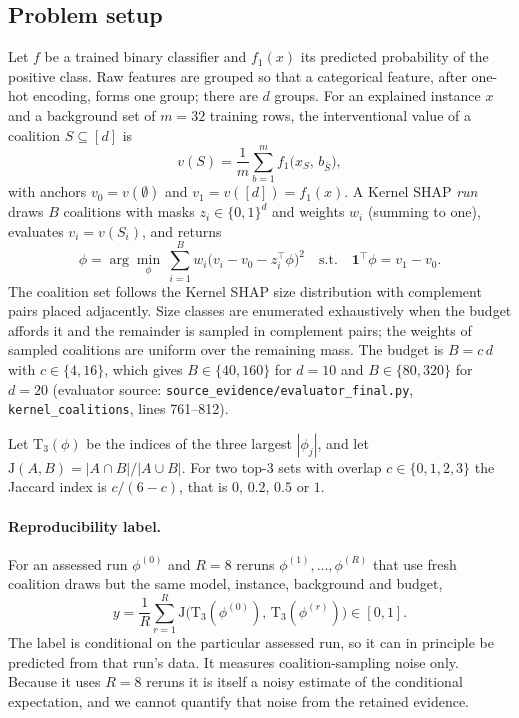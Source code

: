 \documentclass{article}
\newcommand{\topk}{\mathrm{T}_3}
\newcommand{\jac}{\mathrm{J}}
\begin{document}
\subsection{Problem setup}
Let $f$ be a trained binary classifier and $f_1(x)$ its predicted probability of the positive class. Raw features are grouped so that a categorical feature, after one-hot encoding, forms one group; there are $d$ groups. For an explained instance $x$ and a background set of $m=32$ training rows, the interventional value of a coalition $S\subseteq[d]$ is
\begin{equation}
v(S)=\frac1m\sum_{b=1}^{m} f_1\big(x_S,\,b_{\bar S}\big),
\end{equation}
with anchors $v_0=v(\emptyset)$ and $v_1=v([d])=f_1(x)$. A Kernel SHAP \emph{run} draws $B$ coalitions with masks $z_i\in\{0,1\}^d$ and weights $w_i$ (summing to one), evaluates $v_i=v(S_i)$, and returns
\begin{equation}
\phi=\arg\min_{\phi}\ \sum_{i=1}^{B} w_i\big(v_i-v_0-z_i^{\top}\phi\big)^2\quad\text{s.t.}\quad \mathbf 1^{\top}\phi=v_1-v_0 .
\end{equation}
The coalition set follows the Kernel SHAP size distribution with complement pairs placed adjacently. Size classes are enumerated exhaustively when the budget affords it and the remainder is sampled in complement pairs; the weights of sampled coalitions are uniform over the remaining mass. The budget is $B=c\,d$ with $c\in\{4,16\}$, which gives $B\in\{40,160\}$ for $d=10$ and $B\in\{80,320\}$ for $d=20$ (evaluator source: \texttt{source\_evidence/evaluator\_final.py}, \texttt{kernel\_coalitions}, lines 761--812).

Let $\topk(\phi)$ be the indices of the three largest $|\phi_j|$, and let $\jac(A,B)=|A\cap B|/|A\cup B|$. For two top-3 sets with overlap $c\in\{0,1,2,3\}$ the Jaccard index is $c/(6-c)$, that is $0$, $0.2$, $0.5$ or $1$.

\paragraph{Reproducibility label.}
For an assessed run $\phi^{(0)}$ and $R=8$ reruns $\phi^{(1)},\dots,\phi^{(R)}$ that use fresh coalition draws but the same model, instance, background and budget,
\begin{equation}
y=\frac1R\sum_{r=1}^{R}\jac\big(\topk(\phi^{(0)}),\,\topk(\phi^{(r)})\big)\in[0,1].
\end{equation}
The label is conditional on the particular assessed run, so it can in principle be predicted from that run's data. It measures coalition-sampling noise only. Because it uses $R=8$ reruns it is itself a noisy estimate of the conditional expectation, and we cannot quantify that noise from the retained evidence.
\end{document}
